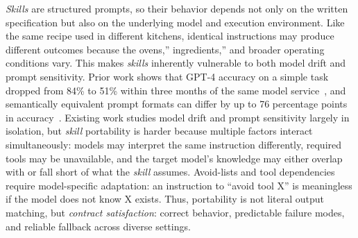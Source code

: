 \documentclass[sigconf,nonacm]{acmart}
\begin{document}
\emph{Skills} are structured prompts, so their behavior depends not only on the written specification but also on the underlying model and execution environment. Like the same recipe used in different kitchens, identical instructions may produce different outcomes because the ovens,'' ingredients,'' and broader operating conditions vary. This makes \emph{skills} inherently vulnerable to both model drift and prompt sensitivity. Prior work shows that GPT-4 accuracy on a simple task dropped from 84\% to 51\% within three months of the same model service~\cite{chen2024chatgptdrift}, and semantically equivalent prompt formats can differ by up to 76 percentage points in accuracy~\cite{sclar2024prompt}.
Existing work studies model drift and prompt sensitivity largely in isolation, but \emph{skill} portability is harder because multiple factors interact simultaneously: models may interpret the same instruction differently, required tools may be unavailable, and the target model's knowledge may either overlap with or fall short of what the \emph{skill} assumes. Avoid-lists and tool dependencies require model-specific adaptation: an instruction to ``avoid tool X'' is meaningless if the model does not know X exists. Thus, portability is not literal output matching, but \emph{contract satisfaction}: correct behavior, predictable failure modes, and reliable fallback across diverse settings.
 

\end{document}
